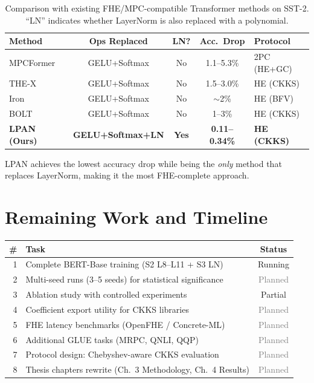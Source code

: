 \documentclass[12pt, a4paper]{article}
\begin{document}
\begin{table}[ht]
\centering
\caption{Comparison with existing FHE/MPC-compatible Transformer methods on SST-2. ``LN'' indicates whether LayerNorm is also replaced with a polynomial.}
\label{tab:comparison}
\renewcommand{\arraystretch}{1.35}
\begin{tabular}{lcccl}
\toprule
\textbf{Method} & \textbf{Ops Replaced} & \textbf{LN?} & \textbf{Acc.\ Drop} & \textbf{Protocol} \\
\midrule
MPCFormer~\cite{mpcformer} & GELU+Softmax & No & 1.1--5.3\% & 2PC (HE+GC) \\
THE-X~\cite{thex}          & GELU+Softmax & No & 1.5--3.0\% & HE (CKKS) \\
Iron~\cite{iron}           & GELU+Softmax & No & $\sim$2\%   & HE (BFV) \\
BOLT~\cite{bolt}           & GELU+Softmax & No & 1--3\%     & HE (CKKS) \\
\midrule
\rowcolor{green!8}
\textbf{LPAN (Ours)}  & \textbf{GELU+Softmax+LN} & \textbf{Yes} & \textbf{0.11--0.34\%} & \textbf{HE (CKKS)} \\
\bottomrule
\end{tabular}
\end{table}

LPAN achieves the lowest accuracy drop while being the \emph{only} method that replaces LayerNorm, making it the most FHE-complete approach.

\section{Remaining Work and Timeline}

\renewcommand{\arraystretch}{1.3}
\begin{tabularx}{\textwidth}{r>{\raggedright\arraybackslash}Xc}
\toprule
\textbf{\#} & \textbf{Task} & \textbf{Status} \\
\midrule
1 & Complete BERT-Base training (S2 L8--L11 + S3 LN) & \textcolor{orange!80!black}{Running} \\
2 & Multi-seed runs (3--5 seeds) for statistical significance & \textcolor{gray}{Planned} \\
3 & Ablation study with controlled experiments & \textcolor{contributiongreen}{Partial} \\
4 & Coefficient export utility for CKKS libraries & \textcolor{gray}{Planned} \\
5 & FHE latency benchmarks (OpenFHE / Concrete-ML) & \textcolor{gray}{Planned} \\
6 & Additional GLUE tasks (MRPC, QNLI, QQP) & \textcolor{gray}{Planned} \\
7 & Protocol design: Chebyshev-aware CKKS evaluation & \textcolor{gray}{Planned} \\
8 & Thesis chapters rewrite (Ch.\ 3 Methodology, Ch.\ 4 Results) & \textcolor{gray}{Planned} \\
\bottomrule
\end{tabularx}
\end{document}
